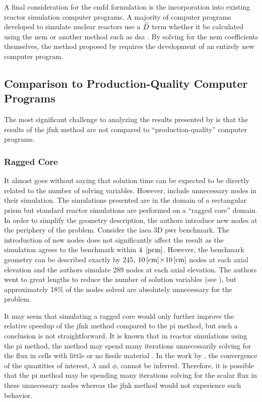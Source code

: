     A final consideration for the \gls{cmfd} formulation is the incorporation
    into existing reactor simulation computer programs. A majority of computer
    programs developed to simulate nuclear reactors use a $\widetilde{D}$ term whether
    it be calculated using the \gls{nem} or another method such as \gls{dsa}
    \cite{casmo4,simulate3,mpact}. By solving for the \gls{nem} coefficients
    themselves, the method proposed by \citeauthor{qe2paper} requires the
    development of an entirely new computer program.

  \subsection{Comparison to Production-Quality Computer Programs}

    The most significant challenge to analyzing the results presented by
    \citeauthor{qe2paper} is that the results of the \gls{jfnk} method are not
    compared to ``production-quality'' computer programs. 
    
    \subsubsection{Ragged Core}

      It almost goes without saying that solution time can be expected to be
      directly related to the number of solving variables. However,
      \citeauthor{qe2paper} include unnecessary nodes in their simulation. The
      simulations presented are in the domain of a rectangular prism but
      standard reactor simulations are performed on a ``ragged core'' domain. In
      order to simplify the geometry description, the authors introduce new
      nodes at the periphery of the problem. Consider the \gls{iaea} 3D
      \gls{pwr} benchmark. The introduction of new nodes does not significantly
      affect the result as the simulation agrees to the benchmark within
      $4~\left[\text{{pcm}}\right]$. However, the benchmark geometry can be described exactly
      by 245, $10\left[\text{{cm}}\right] \! \times \! 10\left[\text{{cm}}\right]$ nodes at each axial
      elevation and the authors simulate 289 nodes at each axial elevation. The
      authors went to great lengths to reduce the number of solution variables
      (see ), but approximately 18\% of the nodes
      solved are absolutely unnecessary for the problem.

      It may seem that simulating a ragged core would only further improve the
      relative speedup of the \gls{jfnk} method compared to the \gls{pi} method,
      but such a conclusion is not straightforward. It is known that in reactor
      simulations using the \gls{pi} method, the method may spend many
      iterations unnecessarily solving for the flux in cells with little or no
      fissile material \cite{gehinThesis}. In the work by \citeauthor{qe2paper},
      the convergence of the quantities of interest, $\lambda$ and
      $\overline{\phi}$, cannot be inferred. Therefore, it is possible that the
      \gls{pi} method may be spending many iterations solving for the scalar
      flux in these unnecessary nodes whereas the \gls{jfnk} method would not
      experience such behavior.

